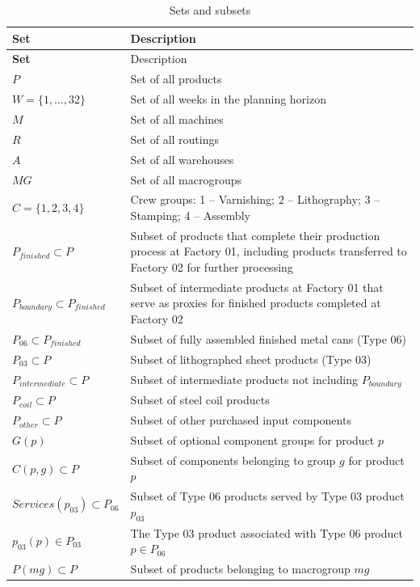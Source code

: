 \documentclass{article}
\begin{document}
\begin{longtable}{l p{8cm}}
\caption{Sets and subsets}\label{tab:sets}\\
\hline
\textbf{Set} & Description \\
\hline
\endfirsthead

\hline
\textbf{Set} & Description \\
\hline
\endhead
$P$ & Set of all products \\ 
$W = \{1, \ldots, 32\}$ & Set of all weeks in the planning horizon \\ 
$M$ & Set of all machines \\
$R$ & Set of all routings \\
$A$ & Set of all warehouses \\ 
$MG$ & Set of all macrogroups \\ 
$C = \{1, 2, 3, 4\}$ & Crew groups: 1 -- Varnishing; 2 -- Lithography; 3 -- Stamping; 4 -- Assembly \\
\hline
$P_{finished} \subset P$ & Subset of products that complete their production process at Factory 01, including products transferred to Factory 02 for further processing \\
$P_{boundary} \subset P_{finished}$ & Subset of intermediate products at Factory 01 that serve as proxies for finished products completed at Factory 02 \\
$P_{06} \subset P_{finished}$ & Subset of fully assembled finished metal cans (Type 06) \\
$P_{03} \subset P$ & Subset of lithographed sheet products (Type 03) \\
$P_{intermediate} \subset P$ & Subset of intermediate products not including $P_{boundary}$ \\ 
$P_{coil} \subset P$ & Subset of steel coil products \\
$P_{other} \subset P$ & Subset of other purchased input components \\ 
$G(p)$ & Subset of optional component groups for product $p$ \\
$C(p,g) \subset P$ & Subset of components belonging to group $g$ for product $p$ \\
$Services(p_{03}) \subset P_{06}$ & Subset of Type 06 products served by Type 03 product $p_{03}$ \\
$p_{03}(p) \in P_{03}$ & The Type 03 product associated with Type 06 product $p \in P_{06}$ \\
$P(mg) \subset P$ & Subset of products belonging to macrogroup $mg$ \\ 

\end{longtable}
\end{document}
